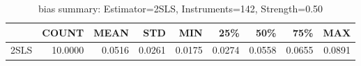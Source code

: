 \begin{table}[ht]
\centering
\caption{bias summary: Estimator=2SLS, Instruments=142, Strength=0.50}
\begin{tabular}{lrrrrrrrr}
\toprule
 & COUNT & MEAN & STD & MIN & 25\% & 50\% & 75\% & MAX \\
\midrule
2SLS & 10.0000 & 0.0516 & 0.0261 & 0.0175 & 0.0274 & 0.0558 & 0.0655 & 0.0891 \\
\bottomrule
\end{tabular}
\end{table}
